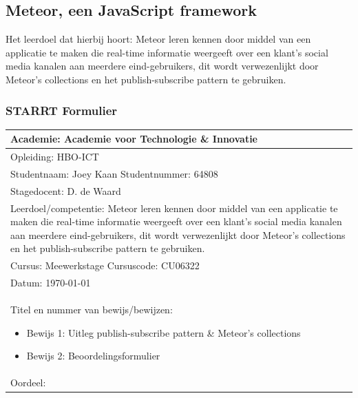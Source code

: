 \clearpage

\subsection{Meteor, een JavaScript framework}
Het leerdoel dat hierbij hoort: Meteor leren kennen door middel van een applicatie te maken die real-time informatie weergeeft over een klant’s social media kanalen aan meerdere eind-gebruikers, dit wordt verwezenlijkt door Meteor’s collections en het publish-subscribe pattern te gebruiken.

\subsubsection{STARRT Formulier}
\begin{tabularx}{\textwidth}{| l | X |}
\hline
\multicolumn{2}{|l|}{Academie: Academie voor Technologie \& Innovatie } \\
\hline
\multicolumn{2}{|l|}{Opleiding: HBO-ICT } \\
\hline
\multicolumn{2}{|l|}{Studentnaam: Joey Kaan \hspace{35pt} Studentnummer: 64808} \\
\hline
\multicolumn{2}{|l|}{Stagedocent: D. de Waard} \\
\hline
\multicolumn{2}{|p{\textwidth-1in}|}{Leerdoel/competentie: Meteor leren kennen door middel van een applicatie te maken die real-time informatie weergeeft over een klant’s social media kanalen aan meerdere eind-gebruikers, dit wordt verwezenlijkt door Meteor’s collections en het publish-subscribe pattern te gebruiken.} \\
\hline
\multicolumn{2}{|l|}{Cursus: Meewerkstage \hspace{35pt} Cursuscode: CU06322} \\
\hline
\multicolumn{2}{|l|}{Datum: \today} \\
\hline
\multicolumn{2}{|l|}{
\begin{minipage}{0.9\columnwidth}
Titel en nummer van bewijs/bewijzen:
\begin{itemize}
\item Bewijs 1: Uitleg publish-subscribe pattern \& Meteor's collections
\item Bewijs 2: Beoordelingsformulier
\end{itemize}
\end{minipage}
} \\ [50pt]
\hline
\multicolumn{2}{|l|}{Oordeel: } \\
\hline

\end{tabularx}

